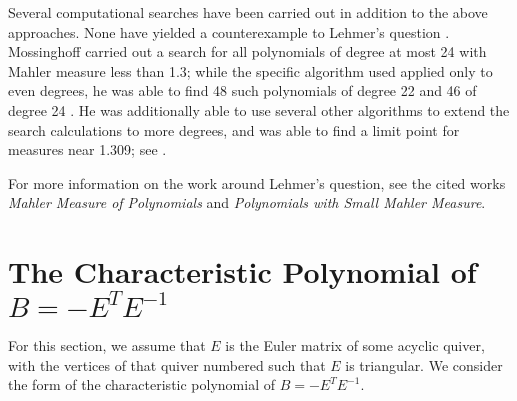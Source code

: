 \documentclass{amsart}
\theoremstyle{theorem}
\theoremstyle{theorem*}
\theoremstyle{definition}
\begin{document}
Several computational searches have been carried out in addition to the above
approaches. None have yielded a counterexample to Lehmer's question \cite{m}.
Mossinghoff carried out a search for all polynomials of degree at most 24 with
Mahler measure less than 1.3; while the specific algorithm used applied only to
even degrees, he was able to find 48 such polynomials of degree 22 and 46 of
degree 24 \cite{m}. He was additionally able to use several other algorithms to
extend the search calculations to more degrees, and was able to find a limit
point for measures near 1.309; see \cite{m}.

For more information on the work around Lehmer's question, see the cited works
\textit{Mahler Measure of Polynomials} and \textit{Polynomials with Small Mahler
    Measure}.

\section{The Characteristic Polynomial of $B = -E^T E^{-1}$}

For this section, we assume that $E$ is the Euler matrix of some acyclic quiver,
with the vertices of that quiver numbered such that $E$ is triangular. We consider
the form of the characteristic polynomial of $B = - E^T E^{-1}$.
\end{document}
